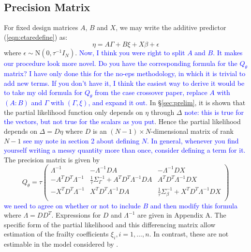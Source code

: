 \documentclass[]{article}
\newcommand{\alex}[1]{\textcolor{blue}{#1}}
\begin{document}
\subsection{Precision Matrix}\label{subsec:Q} 

For fixed design matrices $A$, $B$ and $X$, we may write the additive predictor (\ref{eqn:etaredefine}) as:
\begin{equation}
\eta = A\Gamma + B\xi + X\beta + \epsilon
\end{equation}
where $\epsilon \sim \text{N}\left( 0,\tau^{-1}I_{N}\right)$.
\alex{Now, I think you were right to split $A$ and $B$. It makes our procedure look more novel. Do you have the corresponding formula for the $Q_{\theta}$ matrix? I have only done this for the no-eps methodology, in which it is trivial to add new terms. If you don't have it, I think the easiest way to derive it would be to take my old formula for $Q_{\theta}$ from the case crossover paper, replace $A$ with $(A:B)$ and $\Gamma$ with $(\Gamma,\xi)$, and expand it out. }
In \S\ref{sec:prelim}, it is shown that the partial likelihood function only depends on $\eta$ through $\Delta$ \alex{note: this is true for the vectors, but not true for the scalars as you put}. Hence the partial likelihood depends on $\Delta = D\eta$ where $D$ is an $(N -1) \times N $-dimensional matrix of rank $N -1$ \alex{see my note in section 2 about defining $N$. In general, whenever you find yourself writing a messy quantity more than once, consider defining a term for it.} The precision matrix is given by
\begin{equation}\label{eqn:precmat}
Q_{\theta} = \tau\begin{pmatrix}
\Lambda^{-1} & -\Lambda^{-1}DA & - \Lambda^{-1}DX \\
- A^{T}D^{T}\Lambda^{-1} & \frac{1}{\tau}\Sigma_{\Gamma}^{-1} +  A^{T}D^{T}\Lambda^{-1}DA &  A^{T}D^{T}\Lambda^{-1}DX \\
- X^{T}D^{T}\Lambda^{-1} &  X^{T}D^{T}\Lambda^{-1}DA & \frac{1}{\tau}\Sigma_{\beta}^{-1} +  X^{T}D^{T}\Lambda^{-1}DX \\
\end{pmatrix}
\end{equation}
\alex{we need to agree on whether or not to include $B$ and then modify this formula} where $\Lambda = DD^{T}$. Expressions for $D$ and $\Lambda^{-1}$ are given in Appendix A. The specific form of the partial likelihood and this differencing matrix allow estimation of the frailty coefficients $\xi_{i},i = 1,\ldots,n$. In contrast, these are not estimable in the model considered by \citet{casecross}.
\end{document}
